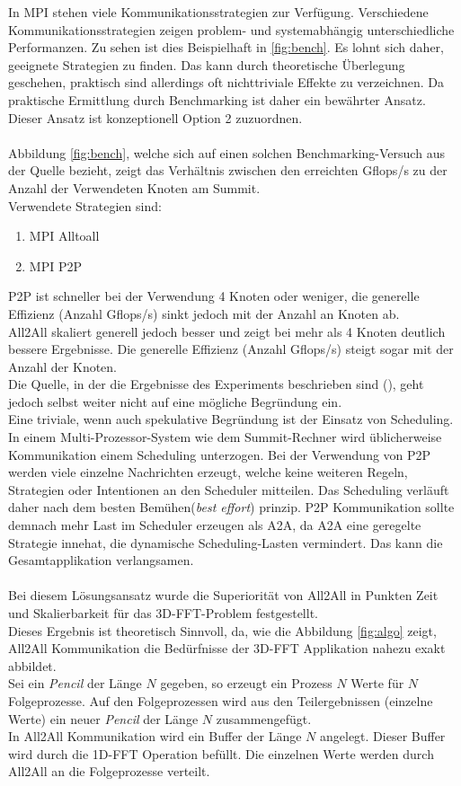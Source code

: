 In MPI stehen viele Kommunikationsstrategien zur Verfügung. Verschiedene Kommunikationsstrategien zeigen problem- und systemabhängig unterschiedliche Performanzen. Zu sehen ist dies Beispielhaft in \ref{fig:bench}.
Es lohnt sich daher, geeignete Strategien zu finden. Das kann durch theoretische Überlegung geschehen, praktisch sind allerdings oft nichttriviale Effekte zu verzeichnen. Da praktische Ermittlung durch Benchmarking ist daher ein bewährter Ansatz.\\
Dieser Ansatz ist konzeptionell Option 2 zuzuordnen.\\
\\
Abbildung \ref{fig:bench}, welche sich auf einen solchen Benchmarking-Versuch aus der Quelle \cite{mainpaper} bezieht, zeigt das Verhältnis zwischen den erreichten Gflops/s zu der Anzahl der Verwendeten Knoten am Summit.\\
Verwendete Strategien sind:
\begin{enumerate}
	\item MPI Alltoall
	\item MPI P2P
\end{enumerate}
P2P ist schneller bei der Verwendung 4 Knoten oder weniger, die generelle Effizienz (Anzahl Gflops/s) sinkt jedoch mit der Anzahl an Knoten ab.\\
All2All skaliert generell jedoch besser und zeigt bei mehr als 4 Knoten deutlich bessere Ergebnisse. Die generelle Effizienz (Anzahl Gflops/s) steigt sogar mit der Anzahl der Knoten.\\
Die Quelle, in der die Ergebnisse des Experiments beschrieben sind (\cite{mainpaper}), geht jedoch selbst weiter nicht auf eine mögliche Begründung ein.\\
Eine triviale, wenn auch spekulative Begründung ist der Einsatz von Scheduling. In einem Multi-Prozessor-System wie dem Summit-Rechner wird üblicherweise Kommunikation einem Scheduling unterzogen. Bei der Verwendung von P2P werden viele einzelne Nachrichten erzeugt, welche keine weiteren Regeln, Strategien oder Intentionen an den Scheduler mitteilen. Das Scheduling verläuft daher nach dem \glqq besten Bemühen\grqq(\textit{best effort}) prinzip. P2P Kommunikation sollte demnach mehr Last im Scheduler erzeugen als A2A, da A2A eine geregelte Strategie innehat, die dynamische Scheduling-Lasten vermindert. Das kann die Gesamtapplikation verlangsamen.\\
\\
Bei diesem Lösungsansatz wurde die Superiorität von All2All in Punkten Zeit und Skalierbarkeit für das 3D-FFT-Problem festgestellt.\\
Dieses Ergebnis ist theoretisch Sinnvoll, da, wie die Abbildung \ref{fig:algo} zeigt, All2All Kommunikation die Bedürfnisse der 3D-FFT Applikation nahezu exakt abbildet.\\
Sei ein \textit{Pencil} der Länge $N$ gegeben, so erzeugt ein Prozess $N$ Werte für $N$ Folgeprozesse. Auf den Folgeprozessen wird aus den Teilergebnissen (einzelne Werte) ein neuer \textit{Pencil} der Länge $N$ zusammengefügt.\\
In All2All Kommunikation wird ein Buffer der Länge $N$ angelegt. Dieser Buffer wird durch die 1D-FFT Operation befüllt. Die einzelnen Werte werden durch All2All an die Folgeprozesse verteilt.

